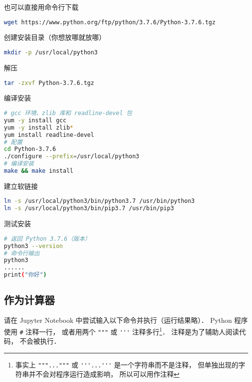 也可以直接用命令行下载
\begin{lstlisting}[language=bash]
wget https://www.python.org/ftp/python/3.7.6/Python-3.7.6.tgz
\end{lstlisting}

创建安装目录（你想放哪就放哪）
\begin{lstlisting}[language=bash]
mkdir -p /usr/local/python3
\end{lstlisting}

解压
\begin{lstlisting}[language=bash]
tar -zxvf Python-3.7.6.tgz
\end{lstlisting}

编译安装
\begin{lstlisting}[language=bash]
# gcc 环境、zlib 库和 readline-devel 包
yum -y install gcc
yum -y install zlib*
yum install readline-devel
# 配置
cd Python-3.7.6
./configure --prefix=/usr/local/python3
# 编译安装
make && make install
\end{lstlisting}

建立软链接
\begin{lstlisting}[language=bash]
ln -s /usr/local/python3/bin/python3.7 /usr/bin/python3
ln -s /usr/local/python3/bin/pip3.7 /usr/bin/pip3
\end{lstlisting}

测试安装
\begin{lstlisting}[language=bash]
# 返回 Python 3.7.6（版本）
python3 --version
# 命令行输出
python3
......
print("你好")
\end{lstlisting}

\subsection{作为计算器}
请在 Jupyter Notebook 中尝试输入以下命令并执行（运行结果略）． Python 程序使用 \verb|#| 注释一行，  或者用两个 \verb|"""| 或 \verb|'''| 注释多行\footnote{事实上 \lstinline|"""..."""| 或 \lstinline|'''...'''| 是一个字符串而不是注释， 但单独出现的字符串并不会对程序运行造成影响， 所以可以用作注释}． 注释是为了辅助人阅读代码， 不会被执行．


